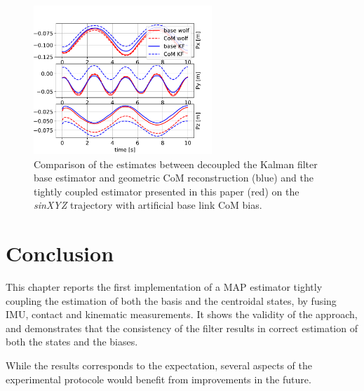 \begin{figure}[t]
    \centering
    \includegraphics[width=0.6\textwidth]{figures/centroidal/base_com_position_wolf_vs_KF.pdf}
    \caption{Comparison of the estimates between decoupled the Kalman filter base estimator and geometric CoM reconstruction (blue) and 
    the tightly coupled estimator presented in this paper (red) on the \textit{sinXYZ} trajectory with artificial base link CoM bias.}
    \label{fig:comparison_KF_wolf}
\end{figure}




\section{Conclusion}

This chapter reports the first implementation of a MAP estimator tightly coupling the estimation of both the basis and 
the centroidal states, by fusing IMU, contact and kinematic measurements. It shows the validity of the approach, 
and demonstrates that the consistency of the filter results in correct estimation of both the states and the biases.

While the results corresponds to the expectation, several aspects of the experimental protocole would benefit from 
improvements in the future. 
